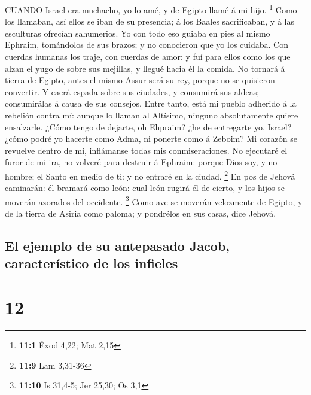  CUANDO Israel era muchacho, yo lo amé, y de Egipto llamé á
mi hijo. \footnote{\textbf{11:1} Éxod 4,22; Mat 2,15}  Como
los llamaban, así ellos se iban de su presencia; á los Baales
sacrificaban, y á las esculturas ofrecían sahumerios.  Yo
con todo eso guiaba en pies al mismo Ephraim, tomándolos de sus brazos;
y no conocieron que yo los cuidaba.  Con cuerdas humanas los
traje, con cuerdas de amor: y fuí para ellos como los que alzan el yugo
de sobre sus mejillas, y llegué hacia él la comida.  No
tornará á tierra de Egipto, antes el mismo Assur será su rey, porque no
se quisieron convertir.  Y caerá espada sobre sus ciudades,
y consumirá sus aldeas; consumirálas á causa de sus consejos.
 Entre tanto, está mi pueblo adherido á la rebelión contra
mí: aunque lo llaman al Altísimo, ninguno absolutamente quiere
ensalzarle.  ¿Cómo tengo de dejarte, oh Ehpraim? ¿he de
entregarte yo, Israel? ¿cómo podré yo hacerte como Adma, ni ponerte como
á Zeboim? Mi corazón se revuelve dentro de mí, inflámanse todas mis
conmiseraciones.  No ejecutaré el furor de mi ira, no
volveré para destruir á Ephraim: porque Dios soy, y no hombre; el Santo
en medio de ti: y no entraré en la ciudad. \footnote{\textbf{11:9} Lam
  3,31-36}  En pos de Jehová caminarán: él bramará como
león: cual león rugirá él de cierto, y los hijos se moverán azorados del
occidente. \footnote{\textbf{11:10} Is 31,4-5; Jer 25,30; Os 3,1}
 Como ave se moverán velozmente de Egipto, y de la tierra
de Asiria como paloma; y pondrélos en sus casas, dice Jehová.

\hypertarget{el-ejemplo-de-su-antepasado-jacob-caracteruxedstico-de-los-infieles}{%
\subsection{El ejemplo de su antepasado Jacob, característico de los
infieles}\label{el-ejemplo-de-su-antepasado-jacob-caracteruxedstico-de-los-infieles}}

\hypertarget{section-11}{%
\section{12}\label{section-11}}

